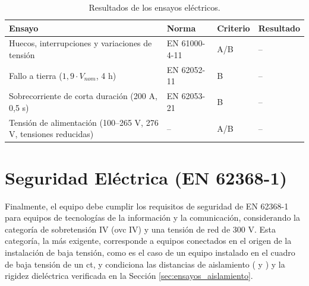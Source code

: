 \begin{table}[!h]
\centering
\small
\begin{tabular}{|p{5.2cm}|p{2.8cm}|p{2.0cm}|p{3.4cm}|}
\hline
\textbf{Ensayo} & \textbf{Norma} & \textbf{Criterio} & \textbf{Resultado} \\ \hline
Huecos, interrupciones y variaciones de tensión & EN 61000-4-11 & A/B & -- \\ \hline
Fallo a tierra ($1,9 \cdot V_{nom}$, 4 h) & EN 62052-11 & B & -- \\ \hline
Sobrecorriente de corta duración (200 A, 0,5 s) & EN 62053-21 & B & -- \\ \hline
Tensión de alimentación (100--265 V, 276 V, tensiones reducidas) & -- & A/B & -- \\ \hline
\end{tabular}
\caption{Resultados de los ensayos eléctricos.}
\label{tab:resultados_ensayos_electricos}
\end{table}

\section{Seguridad Eléctrica (EN 62368-1)}
\label{sec:ensayos_seguridad}

Finalmente, el equipo debe cumplir los requisitos de seguridad de EN 62368-1 para equipos de tecnologías de la información y la comunicación, considerando la categoría de sobretensión IV (\gls{ovc} IV) y una tensión de red de 300 V. Esta categoría, la más exigente, corresponde a equipos conectados en el origen de la instalación de baja tensión, como es el caso de un equipo instalado en el cuadro de baja tensión de un \gls{ct}, y condiciona las distancias de aislamiento (\textit{} y \textit{}) y la rigidez dieléctrica verificada en la Sección \ref{sec:ensayos_aislamiento}.

